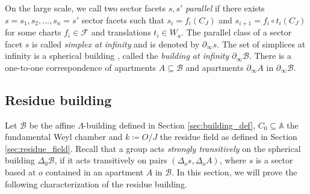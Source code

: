 \documentclass[12pt]{amsart}
\newcommand{\A}{\mathbb{A}}
\newcommand{\Fun}{\mathscr{F}} %
\newcommand{\B}{\mathcal{B}}
\numberwithin{equation}{section}
\theoremstyle{remark} %
\begin{document}
On the large scale, we call two sector facets $s,s'$ \emph{parallel} if there exists $s=s_1, s_2 , \ldots , s_n=s'$ sector facets such that $s_i=f_i(C_J)$ and $s_{i+1}=f_i \circ t_i (C_J)$ for some charts $f_i\in \Fun$ and translations $t_i\in W_a$. The parallel class of a sector facet $s$ is called \emph{simplex at infinity} and is denoted by $\partial_\infty s$. The set of simplices at infinity is a spherical building \cite[Section 3.4]{Ben1}, called the \emph{building at infinity} $\partial_{\infty}\B$. There is a one-to-one correspondence of apartments $A\subseteq \B$ and apartments $\partial_\infty A$ in $\partial_\infty \B$.


\subsection{Residue building}

Let $\B$ be the affine $\Lambda$-building defined in Section \ref{sec:building_def}, $C_0 \subseteq \A$ the fundamental Weyl chamber and $k \coloneqq O / J$ the residue field as defined in Section \ref{sec:residue_field}. Recall that a group acts \emph{strongly transitively} on the spherical building $\Delta_0\B$, if it acts transitively on pairs $(\Delta_os,\Delta_o A)$, where $s$ is a sector based at $o$ contained in an apartment $A$ in $\B$. In this section, we will prove the following characterization of the residue building.
\end{document}
